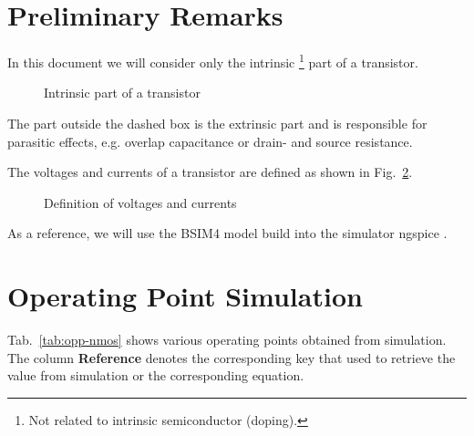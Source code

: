 \documentclass{article}[11pt]
\begin{document}
\notetitle


\section{Preliminary Remarks}

In this document we will consider only the intrinsic%
\footnote{Not related to intrinsic semiconductor (doping).}
part of a transistor.
\begin{figure}[H]
  \centering
  \begin{tikzpicture}[scale=0.8]
    
  \end{tikzpicture}
  \caption{Intrinsic part of a transistor \cite[sec. 6]{tsividis-mosfetmodel-11}}
  \label{fig:intrinsic-transistor}
\end{figure}
The part outside the dashed box is the extrinsic part and is responsible for
parasitic effects, e.g. overlap capacitance or drain- and source resistance.

\medskip

The voltages and currents of a transistor are defined as shown in
Fig.~\ref{fig:volt-current-def}.

\begin{figure}[H]
  \centering
  \begin{tikzpicture}[scale=0.9]
    
  \end{tikzpicture}
  \caption{Definition of voltages and currents}
  \label{fig:volt-current-def}
\end{figure}

As a reference, we will use the BSIM4 model \cite{bsim480-man}
build into the simulator ngspice \cite{ngspice-44}.

\newpage

\section{Operating Point Simulation}

Tab.~\ref{tab:opp-nmos} shows various operating points obtained from simulation.
The column \textbf{Reference} denotes the corresponding key that used to
retrieve the value from simulation or the corresponding equation.
\end{document}
